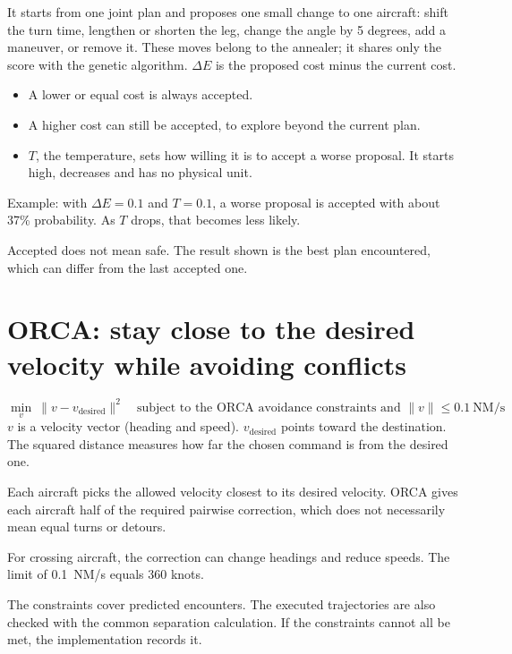 \documentclass[10pt,a4paper]{article}
\begin{document}
It starts from one joint plan and proposes one small change to one aircraft: shift the turn time, lengthen or shorten the leg, change the angle by 5 degrees, add a maneuver, or remove it. These moves belong to the annealer; it shares only the score with the genetic algorithm. $\Delta E$ is the proposed cost minus the current cost.
\begin{itemize}
\item A lower or equal cost is always accepted.
\item A higher cost can still be accepted, to explore beyond the current plan.
\item $T$, the temperature, sets how willing it is to accept a worse proposal. It starts high, decreases and has no physical unit.
\end{itemize}
Example: with $\Delta E = 0.1$ and $T = 0.1$, a worse proposal is accepted with about 37\% probability. As $T$ drops, that becomes less likely.

Accepted does not mean safe. The result shown is the best plan encountered, which can differ from the last accepted one.

\section{ORCA: stay close to the desired velocity while avoiding conflicts}
\[
\min_{v}\ \lVert v - v_{\text{desired}}\rVert^{2}
\quad \text{subject to the ORCA avoidance constraints and } \lVert v\rVert \le 0.1\ \text{NM/s}
\]
$v$ is a velocity vector (heading and speed). $v_{\text{desired}}$ points toward the destination. The squared distance measures how far the chosen command is from the desired one.

Each aircraft picks the allowed velocity closest to its desired velocity. ORCA gives each aircraft half of the required pairwise correction, which does not necessarily mean equal turns or detours.

For crossing aircraft, the correction can change headings and reduce speeds. The limit of 0.1~NM/s equals 360 knots.

The constraints cover predicted encounters. The executed trajectories are also checked with the common separation calculation. If the constraints cannot all be met, the implementation records it.
\end{document}
